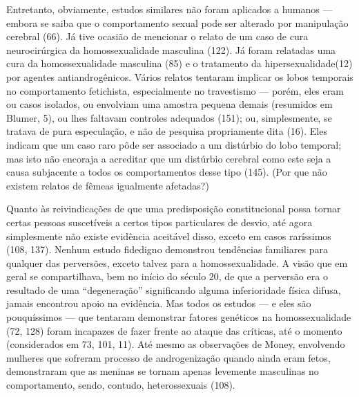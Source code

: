 Entretanto, obviamente, estudos similares não foram aplicados a humanos
--- embora se saiba que o comportamento sexual pode ser alterado por
manipulação cerebral\idxcerea{} (66). Já tive ocasião de mencionar o relato de um
caso de cura neurocirúrgica da homossexualidade masculina (122).\idxhomosbiol{} Já
foram relatadas uma cura da homossexualidade masculina (85) e o
tratamento da hipersexualidade\idxcerebhipe[|)] (12) por agentes antiandrogênicos.
Vários relatos tentaram implicar os lobos temporais\idxfeticlobo{} no comportamento fetichista, especialmente no travestismo --- porém, eles eram ou casos isolados, ou envolviam uma amostra pequena demais (resumidos em Blumer,\idxblumer{} 5), ou lhes faltavam controles adequados (151); ou, simplesmente, se tratava de pura especulação, e não de pesquisa propriamente dita (16).
Eles indicam que um caso raro pôde ser associado a um distúrbio do lobo temporal;\idxcerebepil{} mas isto não encoraja a acreditar que um distúrbio cerebral como este seja a causa subjacente a todos os comportamentos desse tipo (145). (Por que não existem relatos de fêmeas igualmente afetadas?)

 Quanto às reivindicações de que uma predisposição constitucional possa
tornar certas pessoas suscetíveis a certos tipos particulares de
desvio, até agora simplesmente não existe evidência aceitável disso,
exceto em casos raríssimos (108, 137). Nenhum estudo fidedigno
demonstrou tendências familiares para qualquer das perversões, exceto
talvez para a homossexualidade. A visão que em geral se compartilhava,
bem no início do século 20, de que a perversão era o resultado de uma
``degeneração'' significando alguma
inferioridade física difusa, jamais encontrou apoio na evidência. Mas
todos os estudos --- e eles são pouquíssimos --- que tentaram demonstrar
fatores genéticos\idxhomoshera{} na\idxhomosbiol{} homossexualidade\idxgenethomo{} (72, 128) foram incapazes de
fazer frente ao ataque das críticas, até o momento (considerados em 73,
101, 11). Até mesmo as observações de Money,\idxmoney{} envolvendo mulheres que
sofreram processo de androgenização\idxhormhomo{} quando ainda eram fetos,
demonstraram que as meninas se tornam apenas levemente masculinas no
comportamento, sendo, contudo, heterossexuais (108).

